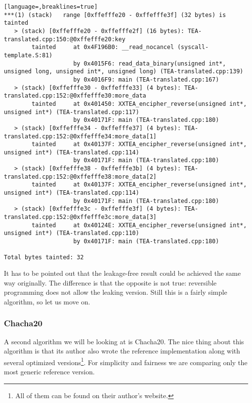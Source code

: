 \documentclass[a4paper,10pt,openright]{memoir}
\begin{document}
\begin{lstlisting}[language=,breaklines=true]
***(1) (stack)	 range [0xffefffe20 - 0xffefffe3f] (32 bytes) is tainted
   > (stack) [0xffefffe20 - 0xffefffe2f] (16 bytes): TEA-translated.cpp:150:@0xffefffe20:key
        tainted     at 0x4F196B0: __read_nocancel (syscall-template.S:81)
                    by 0x4015F6: read_data_binary(unsigned int*, unsigned long, unsigned int*, unsigned long) (TEA-translated.cpp:139)
                    by 0x4016F9: main (TEA-translated.cpp:167)
   > (stack) [0xffefffe30 - 0xffefffe33] (4 bytes): TEA-translated.cpp:152:@0xffefffe30:more_data
        tainted     at 0x401450: XXTEA_encipher_reverse(unsigned int*, unsigned int*) (TEA-translated.cpp:117)
                    by 0x40171F: main (TEA-translated.cpp:180)
   > (stack) [0xffefffe34 - 0xffefffe37] (4 bytes): TEA-translated.cpp:152:@0xffefffe34:more_data[1]
        tainted     at 0x40137F: XXTEA_encipher_reverse(unsigned int*, unsigned int*) (TEA-translated.cpp:114)
                    by 0x40171F: main (TEA-translated.cpp:180)
   > (stack) [0xffefffe38 - 0xffefffe3b] (4 bytes): TEA-translated.cpp:152:@0xffefffe38:more_data[2]
        tainted     at 0x40137F: XXTEA_encipher_reverse(unsigned int*, unsigned int*) (TEA-translated.cpp:114)
                    by 0x40171F: main (TEA-translated.cpp:180)
   > (stack) [0xffefffe3c - 0xffefffe3f] (4 bytes): TEA-translated.cpp:152:@0xffefffe3c:more_data[3]
        tainted     at 0x40124E: XXTEA_encipher_reverse(unsigned int*, unsigned int*) (TEA-translated.cpp:110)
                    by 0x40171F: main (TEA-translated.cpp:180)

Total bytes tainted: 32
\end{lstlisting}

It has to be pointed out that the leakage-free result could be achieved 
the same way originally. The difference is that the opposite is not 
true: reversible programming does not allow the leaking version. Still 
this is a fairly simple algorithm, so let us move on.

\subsubsection{Chacha20}

A second algorithm we will be looking at is Chacha20. The nice thing 
about this algorithm is that its author also wrote the reference 
implementation along with several optimized versions\footnote{All of 
them can be found on their author's website.}. For simplicity and 
fairness we are comparing only the most generic reference version.
\end{document}
